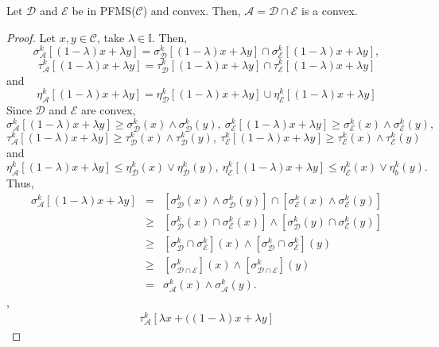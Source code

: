\documentclass[10pt,a4paper]{amsart}
\begin{document}
\begin{proposition} \label{i}
Let $\mathcal{D}$ and $\mathcal{E}$ be in PFMS($\mathcal{C}$) and convex. Then, $\mathcal{A} = \mathcal{D} \cap \mathcal{E}$ is a convex.
\end{proposition}

\begin{proof}
Let $x, y \in \mathcal{C}$, take $\lambda \in \mathbb{I}$. Then, $$\sigma^k_{\mathcal{A}} [(1 - \lambda)x + \lambda y] = \sigma^k_{\mathcal{D}} [(1 - \lambda)x + \lambda y] \cap \sigma^k_{\mathcal{E}} [(1 - \lambda)x + \lambda y],$$ $$\tau^k_{\mathcal{A}} [(1 - \lambda)x + \lambda y] = \tau^k_{\mathcal{D}} [(1 - \lambda)x + \lambda y] \cap \tau^k_{\mathcal{E}} [(1 - \lambda)x + \lambda y]$$ and $$\eta^k_{\mathcal{A}} [(1 - \lambda)x + \lambda y] = \eta^k_{\mathcal{D}} [(1 - \lambda)x + \lambda y] \cup \eta^k_{\mathcal{E}} [(1 - \lambda)x + \lambda y]$$ Since $\mathcal{D}$ and $\mathcal{E}$ are convex, $$\sigma^k_{\mathcal{A}} [(1 - \lambda)x + \lambda y] \geq \sigma^k_{\mathcal{D}}(x) \wedge \sigma^k_{\mathcal{D}}(y),~ \sigma^k_{\mathcal{E}} [(1 - \lambda)x + \lambda y] \geq \sigma^k_{\mathcal{E}}(x) \wedge \sigma^k_{\mathcal{E}}(y),$$ $$\tau^k_{\mathcal{A}} [(1 - \lambda)x + \lambda y] \geq \tau^k_{\mathcal{D}}(x) \wedge \tau^k_{\mathcal{D}}(y),~ \tau^k_{\mathcal{E}} [(1 - \lambda)x + \lambda y] \geq \tau^k_{\mathcal{E}}(x) \wedge \tau^k_{\mathcal{E}}(y)$$ and $$\eta^k_{\mathcal{A}} [(1 - \lambda)x + \lambda y] \leq \eta^k_{\mathcal{D}}(x) \vee \eta^k_{\mathcal{D}}(y),~ \eta^k_{\mathcal{E}} [(1 - \lambda)x + \lambda y] \leq \eta^k_{\mathcal{E}}(x) \vee \eta^k_{b}(y).$$ Thus, 
\begin{eqnarray*} \sigma^k_{\mathcal{A}} [(1 - \lambda)x + \lambda y]  
& = & [\sigma^k_{\mathcal{D}} (x) \wedge \sigma^k_{\mathcal{D}} (y)] \cap [\sigma^k_{\mathcal{E}} (x) \wedge \sigma^k_{\mathcal{E}} (y)]\\
&\geq & [\sigma^k_{\mathcal{D}}(x) \cap \sigma^k_{\mathcal{E}}(x)] \wedge [\sigma^k_{\mathcal{D}}(y) \cap \sigma^k_{\mathcal{E}}(y)]\\
&\geq &[\sigma^k_{\mathcal{D}} \cap \sigma^k_{\mathcal{E}}](x) \wedge [\sigma^k_{\mathcal{D}} \cap \sigma^k_{\mathcal{E}}](y)\\ & \geq & [\sigma^k_{\mathcal{D}\cap \mathcal{E}}](x) \wedge [\sigma^k_{\mathcal{D} \cap \mathcal{E} }](y)\\ & = & \sigma^k_{\mathcal{A}} (x) \wedge \sigma^k_{\mathcal{A}} (y).
\end{eqnarray*},
\begin{eqnarray*} \tau^k_{\mathcal{A}} [\lambda x + ((1 - \lambda)x + \lambda y]  

\end{eqnarray*}
\end{proof}
\end{document}
